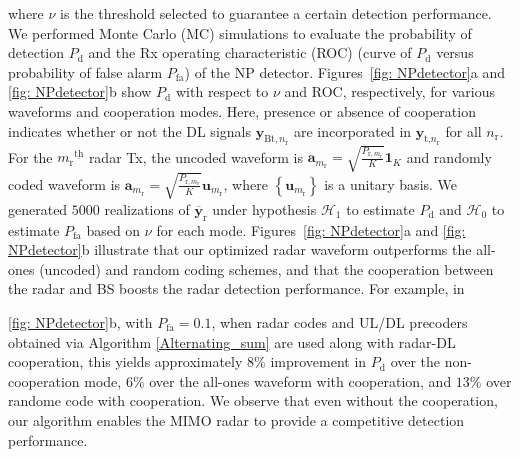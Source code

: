 \documentclass[9pt,journal]{IEEEtran}
\newcommand{\paren}[1]{\left({#1}\right)}
\newcommand{\braces}[1]{{\left\{ {#1}\right\}}}
\newcommand{\ith}[1]    {{#1}^{\underline{\text{th}}}}
\newcommand{\rr}{_\mathrm{r}}
\theoremstyle{definition}
\begin{document}
where $\nu$ is the threshold selected to guarantee a certain detection performance. We performed Monte Carlo (MC) simulations to evaluate the probability of detection $\mathit{P}_{\textrm{d}}$ and the Rx operating characteristic (ROC) (curve of $\mathit{P}_{\textrm{d}}$ versus probability of false alarm $\mathit{P}_{\textrm{fa}}$) of the NP detector. Figures~\ref{fig: NPdetector}a and \ref{fig: NPdetector}b show $\mathit{P}_{\textrm{d}}$ with respect to $\nu$ and ROC, %
respectively, for various waveforms and cooperation modes. Here, presence or absence of cooperation indicates whether or not the DL signals $\mathbf{y}_{\textrm{Bt},n\rr}$ are incorporated in $\mathbf{y}_{\textrm{t,}n\rr}$ for all $n\rr$. For the $\ith{m\rr}$ radar Tx, the uncoded waveform is $\mathbf{a}_{m\rr}=\sqrt{\frac{\mathit{P}_{\textrm{r},m\rr}}{\mathit{K}}}\mathbf{1}_{\mathit{K}}$ and randomly coded waveform is  $\mathbf{a}_{m\rr}=\sqrt{\frac{\mathit{P}_{\textrm{r},m\rr}}{\mathit{K}}}\mathbf{u}_{m\rr}$, where $\braces{\mathbf{u}_{m\rr}}$ is a unitary basis. We generated $5000$ realizations of $\overline{\mathbf{y}}_{\textrm{r}}$ under hypothesis $\mathcal{H}_1$ to estimate $\mathit{P}_{\textrm{d}}$ and $\mathcal{H}_0$ to estimate $\mathit{P}_{\textrm{fa}}$ based on $\nu$ for each mode. Figures~\ref{fig: NPdetector}a and \ref{fig: NPdetector}b illustrate that our optimized radar waveform outperforms the all-ones (uncoded) and random coding schemes, and that the cooperation between the radar and BS boosts the radar detection performance. For example, in \figurename{\;\ref{fig: NPdetector}b, with $P_{\textrm{fa}}=0.1$, when radar codes and UL/DL precoders obtained via Algorithm \ref{Alternating_sum} are used along with radar-DL cooperation, this yields approximately $8\%$ improvement in $P_{\textrm{d}}$ over the non-cooperation mode, $6\%$ over the all-ones waveform with cooperation, and $13\%$ over randome code with cooperation. We observe that even without the cooperation, our algorithm enables the MIMO radar to provide a competitive detection performance.

\vspace{-1em}
}
\end{document}
